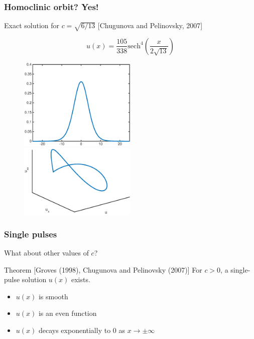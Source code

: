 \documentclass[16pt]{beamer}
\begin{document}
\begin{frame}
	\frametitle{Homoclinic orbit? Yes!}
	\fontsize{16}{7.2}\selectfont
	Exact solution for $c = \sqrt{6/13}$ \footnotesize [Chugunova and Pelinovsky, 2007]
	\begin{center}
	\[
	u(x) = \frac{105}{338}\text{sech}^4\left( \frac{x}{2\sqrt{13}}\right) 
	\]
	\end{center}
	\begin{figure}
   		\includegraphics[width=0.5\textwidth]{images/exactsol}
   		\hfill
   		\includegraphics[width=0.5\textwidth]{images/exactsolorbit}
	\end{figure}
\end{frame}

\begin{frame}
	\frametitle{Single pulses}
	\fontsize{16}{7.2}\selectfont
	What about other values of $c$?

	\vspace{1cm}

	\begin{block}{Theorem \footnotesize [Groves (1998), Chugunova and Pelinovsky (2007)]}
	For $c>0$, a single-pulse solution $u(x)$ exists.
	\begin{itemize}
		\item $u(x)$ is smooth
		\item $u(x)$ is an even function
		\item $u(x)$ decays exponentially to 0 as $x \rightarrow \pm \infty$
	\end{itemize}
	\end{block}
\end{frame}
\end{document}
